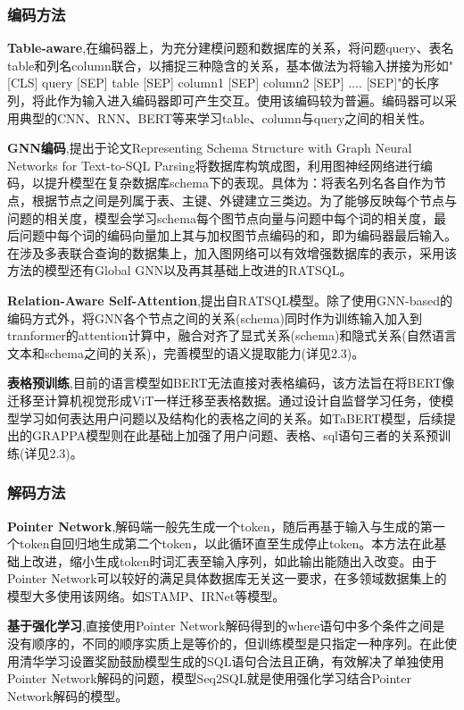 \documentclass[lang=cn,a4paper,newtx]{elegantpaper}
\begin{document}
        \subsubsection{编码方法}
        \textbf{Table-aware\cite{14}},在编码器上，为充分建模问题和数据库的关系，将问题query、表名table和列名column联合，以捕捉三种隐含的关系，基本做法为将输入拼接为形如"[CLS] query [SEP] table [SEP] column1 [SEP] column2 [SEP] .... [SEP]"的长序列，将此作为输入进入编码器即可产生交互。使用该编码较为普遍。编码器可以采用典型的CNN、RNN、BERT等来学习table、column与query之间的相关性。

        \textbf{GNN编码},提出于论文Representing Schema Structure with Graph Neural Networks for Text-to-SQL Parsing\cite{15}将数据库构筑成图，利用图神经网络进行编码，以提升模型在复杂数据库schema下的表现。具体为：将表名列名各自作为节点，根据节点之间是列属于表、主键、外键建立三类边。为了能够反映每个节点与问题的相关度，模型会学习schema每个图节点向量与问题中每个词的相关度，最后问题中每个词的编码向量加上其与加权图节点编码的和，即为编码器最后输入。在涉及多表联合查询的数据集上，加入图网络可以有效增强数据库的表示，采用该方法的模型还有Global GNN\cite{16}以及再其基础上改进的RATSQL\cite{11}。

        \textbf{Relation-Aware Self-Attention},提出自RATSQL模型\cite{11}。除了使用GNN-based的编码方式外，将GNN各个节点之间的关系(schema)同时作为训练输入加入到tranformer的attention计算中，融合对齐了显式关系(schema)和隐式关系(自然语言文本和schema之间的关系)，完善模型的语义提取能力(详见2.3)。

        \textbf{表格预训练},目前的语言模型如BERT无法直接对表格编码，该方法旨在将BERT像迁移至计算机视觉形成ViT一样迁移至表格数据。通过设计自监督学习任务，使模型学习如何表达用户问题以及结构化的表格之间的关系。如TaBERT模型\cite{9}，后续提出的GRAPPA模型\cite{10}则在此基础上加强了用户问题、表格、sql语句三者的关系预训练(详见2.3)。
        
        \subsubsection{解码方法}
        \textbf{Pointer Network},解码端一般先生成一个token，随后再基于输入与生成的第一个token自回归地生成第二个token，以此循环直至生成停止token。本方法在此基础上改进，缩小生成token时词汇表至输入序列，如此输出能随出入改变。由于Pointer Network可以较好的满足具体数据库无关这一要求，在多领域数据集上的模型大多使用该网络。如STAMP\cite{17}、IRNet\cite{18}等模型。

        \textbf{基于强化学习},直接使用Pointer Network解码得到的where语句中多个条件之间是没有顺序的，不同的顺序实质上是等价的，但训练模型是只指定一种序列。在此使用清华学习设置奖励鼓励模型生成的SQL语句合法且正确，有效解决了单独使用Pointer Network解码的问题，模型Seq2SQL\cite{19}就是使用强化学习结合Pointer Network解码的模型。
\end{document}
